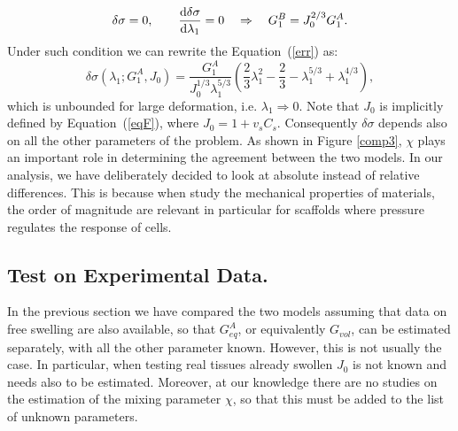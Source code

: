 \begin{equation}
\delta \sigma=0, \qquad \frac{\text{d} \delta \sigma}{\text{d} \lambda_1}=0 \quad\Rightarrow \quad G_1^{B} = J_0^{2/3}G_1^A.
\end{equation}
Under such condition we can rewrite the Equation~(\ref{err}) as:
\begin{equation}
\delta \sigma(\lambda_1;G^A_1,J_0) = \frac{G_1^A}{J^{1/3}_0\lambda_1^{5/3}} \left(\frac{2}{3}\lambda^2_1-\frac{2}{3}-\lambda_1^{5/3}+\lambda_1^{4/3}\right), 
\end{equation}
which is unbounded for large deformation, i.e. $\lambda_1\Rightarrow0$. Note that $J_0$ is implicitly defined by Equation~(\ref{eqF}), where $J_0=1+v_sC_s$. Consequently $\delta\sigma$ depends also on all the other parameters of the problem. As shown in Figure \ref{comp3}, $\chi$ plays an important role in determining the agreement between the two models. In our analysis, we have deliberately decided to look at absolute instead of relative differences. This is because when study the mechanical properties of materials, the order of magnitude are relevant in particular for scaffolds where pressure regulates the response of cells.


\subsection{Test on Experimental Data.}
In the previous section we have compared the two models assuming that data on free swelling are also available, so that $G^A_{eq}$, or equivalently $G_{vol}$, can be estimated separately, with all the other parameter known. However, this is not usually the case. In particular, when testing real tissues already swollen $J_0$ is not known and needs also to be estimated. Moreover, at our knowledge there are no studies on the estimation of the mixing parameter $\chi$, so that this must be added to the list of unknown parameters. 

